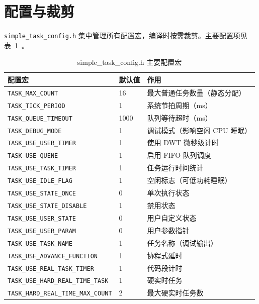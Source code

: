 \section{配置与裁剪}

\texttt{simple\_task\_config.h} 集中管理所有配置宏，编译时按需裁剪。主要配置项见表~\ref{tab:task-config}~。

\begin{table}[htbp]
\centering \caption{simple\_task\_config.h 主要配置宏} \label{tab:task-config}
    \begin{tabular}{lll}
        \toprule
        配置宏 & 默认值 & 作用 \\
        \midrule
        \texttt{TASK\_MAX\_COUNT}              & 16   & 最大普通任务数量（静态分配） \\
        \texttt{TASK\_TICK\_PERIOD}            & 1    & 系统节拍周期（ms） \\
        \texttt{TASK\_QUEUE\_TIMEOUT}          & 1000 & 队列等待超时（ms） \\
        \texttt{TASK\_DEBUG\_MODE}             & 1    & 调试模式（影响空闲 CPU 睡眠） \\
        \texttt{TASK\_USE\_USER\_TIMER}        & 1    & 使用 DWT 微秒级计时 \\
        \texttt{TASK\_USE\_QUENE}              & 1    & 启用 FIFO 队列调度 \\
        \texttt{TASK\_USE\_TASK\_TIMER}        & 1    & 任务运行时间统计 \\
        \texttt{TASK\_USE\_IDLE\_FLAG}         & 1    & 空闲标志（可低功耗睡眠） \\
        \texttt{TASK\_USE\_STATE\_ONCE}        & 0    & 单次执行状态 \\
        \texttt{TASK\_USE\_STATE\_DISABLE}     & 1    & 禁用状态 \\
        \texttt{TASK\_USE\_USER\_STATE}        & 0    & 用户自定义状态 \\
        \texttt{TASK\_USE\_USER\_PARAM}        & 0    & 用户参数指针 \\
        \texttt{TASK\_USE\_TASK\_NAME}         & 1    & 任务名称（调试输出） \\
        \texttt{TASK\_USE\_ADVANCE\_FUNCTION}  & 1    & 协程式延时 \\
        \texttt{TASK\_USE\_REAL\_TASK\_TIMER}  & 1    & 代码段计时 \\
        \texttt{TASK\_USE\_HARD\_REAL\_TIME\_TASK} & 1 & 硬实时任务 \\
        \texttt{TASK\_HARD\_REAL\_TIME\_MAX\_COUNT} & 2 & 最大硬实时任务数 \\
        \bottomrule
    \end{tabular}
\end{table}

